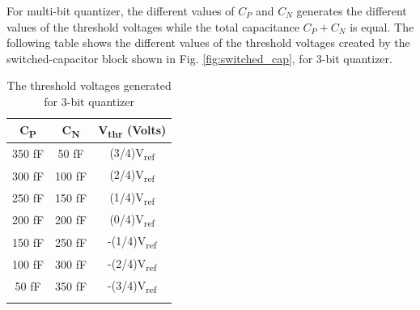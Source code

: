 For multi-bit quantizer, the different values of $C_P$ and $C_N$ generates the different values of the threshold voltages while the total capacitance $C_P+C_N$ is equal. The following table shows the different values of the threshold voltages created by the switched-capacitor block shown in Fig. \ref{fig:switched_cap}, for 3-bit quantizer.
\begin{table}[h!]
\centering
\begin{tabular}{c|c|c}
\Xhline{4\arrayrulewidth}
\textbf{C\textsubscript{P}}      & \textbf{C\textsubscript{N}}      & \textbf{V\textsubscript{thr}} (Volts)     \\ \hline
350 fF                             & 50  fF                             & (3/4)V\textsubscript{ref} \\ \hline
300 fF                             & 100 fF                             & (2/4)V\textsubscript{ref} \\ \hline
250 fF                             & 150 fF                             & (1/4)V\textsubscript{ref} \\ \hline
200 fF                             & 200 fF                             & (0/4)V\textsubscript{ref} \\ \hline
150 fF                             & 250 fF                             & -(1/4)V\textsubscript{ref} \\ \hline
100 fF                             & 300 fF                             & -(2/4)V\textsubscript{ref} \\ \hline
50  fF                             & 350 fF                             & -(3/4)V\textsubscript{ref} \\ \Xhline{4\arrayrulewidth}
\end{tabular}
\caption{The threshold voltages generated for 3-bit quantizer}
\label{tab:vthr}
\end{table}

